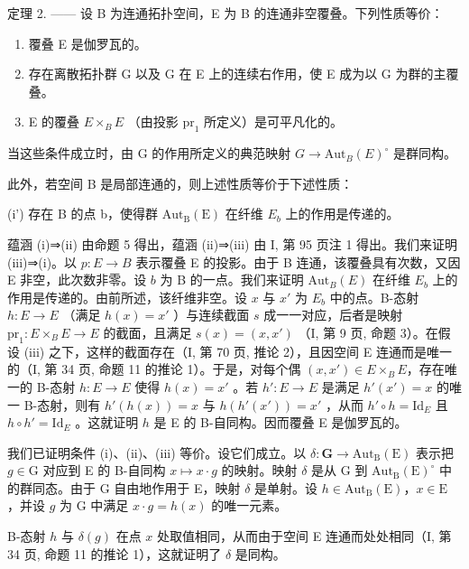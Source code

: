 定理 2. —— 设 B 为连通拓扑空间，E 为 B 的连通非空覆叠。下列性质等价：

\begin{enumerate}
\def\labelenumi{(\roman{enumi})}
\item
  覆叠 E 是伽罗瓦的。
\item
  存在离散拓扑群 G 以及 G 在 E 上的连续右作用，使 E 成为以 G 为群的主覆叠。
\item
  E 的覆叠 \(E \times_{B} E\) （由投影 \(\mathrm{pr}_{1}\) 所定义）是可平凡化的。
\end{enumerate}

当这些条件成立时，由 G 的作用所定义的典范映射 \(G \to \mathrm{Aut}_{B}(E)^{\circ}\) 是群同构。

此外，若空间 B 是局部连通的，则上述性质等价于下述性质：

(i') 存在 B 的点 b，使得群 \(\mathrm{Aut}_{\mathrm{B}}(\mathrm{E})\) 在纤维 \(E_{b}\) 上的作用是传递的。

蕴涵 (i)⇒(ii) 由命题 5 得出，蕴涵 (ii)⇒(iii) 由 I, 第 95 页注 1 得出。我们来证明 (iii)⇒(i)。以 \(p\colon E \to B\) 表示覆叠 E 的投影。由于 B 连通，该覆叠具有次数，又因 E 非空，此次数非零。设 \(b\) 为 B 的一点。我们来证明 \(\mathrm{Aut}_{B}(E)\) 在纤维 \(E_{b}\) 上的作用是传递的。由前所述，该纤维非空。设 \(x\) 与 \(x'\) 为 \(E_{b}\) 中的点。B-态射 \(h\colon E \to E\) （满足 \(h(x) = x'\) ）与连续截面 \(s\) 成一一对应，后者是映射 \(\mathrm{pr}_{1}\colon E \times_{B} E \to E\) 的截面，且满足 \(s(x) = (x, x')\) （I, 第 9 页, 命题 3）。在假设 (iii) 之下，这样的截面存在（I, 第 70 页, 推论 2），且因空间 E 连通而是唯一的（I, 第 34 页, 命题 11 的推论 1）。于是，对每个偶 \((x, x') \in E \times_{B} E\)，存在唯一的 B-态射 \(h\colon E \to E\) 使得 \(h(x) = x'\) 。若 \(h'\colon E \to E\) 是满足 \(h'(x') = x\) 的唯一 B-态射，则有 \(h'(h(x)) = x\) 与 \(h(h'(x')) = x'\) ，从而 \(h' \circ h = \text{Id}_E\) 且 \(h \circ h' = \text{Id}_E\) 。这就证明 \(h\) 是 E 的 B-自同构。因而覆叠 E 是伽罗瓦的。

我们已证明条件 (i)、(ii)、(iii) 等价。设它们成立。以 \(\delta\colon\mathbf{G}\to\mathrm{Aut}_{\mathrm{B}}(\mathrm{E})\) 表示把 \(g\in\mathrm{G}\) 对应到 E 的 B-自同构 \(x\mapsto x\cdot g\) 的映射。映射 \(\delta\) 是从 G 到 \(\mathrm{Aut}_{\mathrm{B}}(\mathrm{E})^{\circ}\) 中的群同态。由于 G 自由地作用于 E，映射 \(\delta\) 是单射。设 \(h\in\mathrm{Aut}_{\mathrm{B}}(\mathrm{E})\)，\(x\in\mathrm{E}\) ，并设 \(g\) 为 G 中满足 \(x\cdot g=h(x)\) 的唯一元素。

B-态射 \(h\) 与 \(\delta(g)\) 在点 \(x\) 处取值相同，从而由于空间 E 连通而处处相同（I, 第 34 页, 命题 11 的推论 1），这就证明了 \(\delta\) 是同构。

